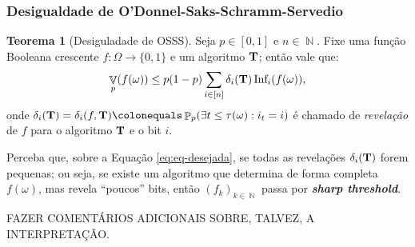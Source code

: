 \documentclass[9pt]{beamer}
\theoremstyle{definition} %
\newtheorem{mythm}{Teorema}
\DeclareMathOperator{\PX}{\mathbb{P}} %
\DeclareMathOperator{\VX}{\mathbb{V}} %
\DeclareMathOperator{\NX}{\mathbb{N}} %
\newcommand{\infl}{\text{Inf}_i(f(\omega))}
\begin{document}
	\begin{frame}[t]
		\frametitle{Desigualdade de O'Donnel-Saks-Schramm-Servedio}	
		\begin{mythm}[Desiguladade de OSSS]\label{thm:osss}
			Seja $p \in [0,1]$ e $n \in \NX$. Fixe uma função Booleana crescente $f: \Omega \longrightarrow \{0,1\}$ e um algoritmo $\text{\textbf{T}}$; então vale que:
			\begin{align*}
				\VX_p(f(\omega)) \leq p(1 - p) \sum_{i \in [n]} \delta_i(\text{\textbf{T}}) \, \infl, 
			\end{align*}
			onde $\delta_i(\text{\textbf{T}}) = \delta_i(f, \text{\textbf{T}}) \colonequals \PX_p(\exists t \leq \tau(\omega) : i_t = i)$ é chamado de \textit{revelação} de $f$ para o algoritmo $\text{\textbf{T}}$ e o bit $i$.
		\end{mythm}
		\vspace{-5pt}
		\pause
		Perceba que, sobre a Equação \ref{eq:eq-desejada}, se todas as revelações $\delta_i(\text{\textbf{T}})$ forem pequenas; ou seja, se existe um algoritmo que determina de forma completa $f(\omega)$, mas revela ``poucos'' bits, então $(f_k)_{k \in \NX}$ passa por \textit{\textbf{sharp threshold}}.
		
		{\color{red} FAZER COMENTÁRIOS ADICIONAIS SOBRE, TALVEZ, A INTERPRETAÇÃO.}
	\end{frame}
\end{document}
